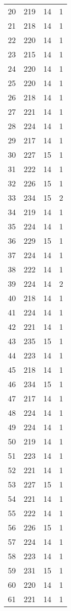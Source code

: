\begin{longtable}[!]{c|ccc}
	20	& 219	& 14	& 1	\\
	21	& 218	& 14	& 1	\\
	22	& 220	& 14	& 1	\\
	23	& 215	& 14	& 1	\\
	24	& 220	& 14	& 1	\\
	25	& 220	& 14	& 1	\\
	26	& 218	& 14	& 1	\\
	27	& 221	& 14	& 1	\\
	28	& 224	& 14	& 1	\\
	29	& 217	& 14	& 1	\\
	30	& 227	& 15	& 1	\\
	31	& 222	& 14	& 1	\\
	32	& 226	& 15	& 1	\\
	33	& 234	& 15	& 2	\\
	34	& 219	& 14	& 1	\\
	35	& 224	& 14	& 1	\\
	36	& 229	& 15	& 1	\\
	37	& 224	& 14	& 1	\\
	38	& 222	& 14	& 1	\\
	39	& 224	& 14	& 2	\\
	40	& 218	& 14	& 1	\\
	41	& 224	& 14	& 1	\\
	42	& 221	& 14	& 1	\\
	43	& 235	& 15	& 1	\\
	44	& 223	& 14	& 1	\\
	45	& 218	& 14	& 1	\\
	46	& 234	& 15	& 1	\\
	47	& 217	& 14	& 1	\\
	48	& 224	& 14	& 1	\\
	49	& 224	& 14	& 1	\\
	50	& 219	& 14	& 1	\\
	51	& 223	& 14	& 1	\\
	52	& 221	& 14	& 1	\\
	53	& 227	& 15	& 1	\\
	54	& 221	& 14	& 1	\\
	55	& 222	& 14	& 1	\\
	56	& 226	& 15	& 1	\\
	57	& 224	& 14	& 1	\\
	58	& 223	& 14	& 1	\\
	59	& 231	& 15	& 1	\\
	60	& 220	& 14	& 1	\\
	61	& 221	& 14	& 1	\\

\end{longtable}

